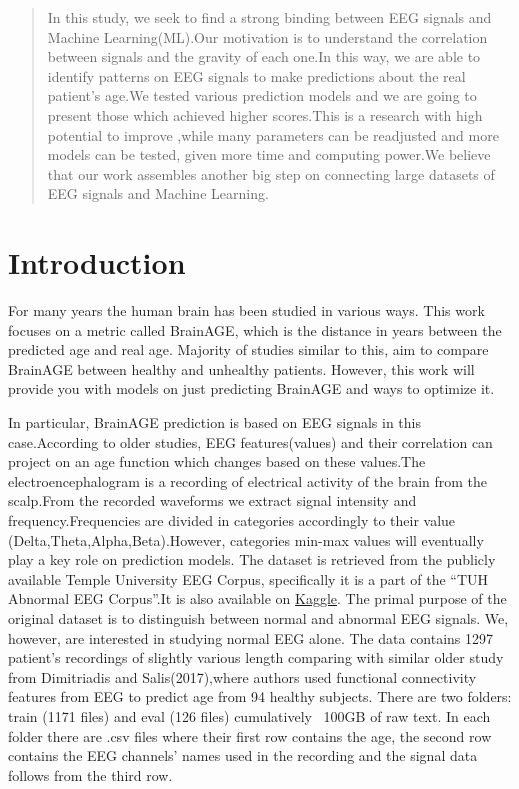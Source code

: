 \begin{abstract}
In this study, we seek to find a strong binding between EEG signals and Machine Learning(ML).Our motivation is to understand the correlation between signals and the gravity of each one.In this way, we are able to identify patterns on EEG signals to make predictions about the real patient’s age.We tested various prediction models and we are going to  present those which achieved higher scores.This is a research with high potential to improve ,while many parameters can be readjusted and more models can be tested, given more time and computing power.We believe that our work assembles another big step on connecting large datasets of EEG signals and Machine Learning.

\end{abstract}

\section{Introduction}
For many years the human brain has been studied in various ways. This work focuses on a metric called BrainAGE, which is the distance in years between the predicted age and real age. Majority of studies similar to this, aim to compare BrainAGE between healthy and unhealthy patients.
However, this work will provide you with models on just predicting BrainAGE and ways to optimize it.
\par
In particular,  BrainAGE prediction is based on EEG signals in this case.According to older studies, EEG features(values) and their correlation can project on an age function which changes based on these values.The electroencephalogram is a recording of electrical activity of the brain from the scalp.From the recorded waveforms we extract signal intensity and frequency.Frequencies are divided in categories accordingly to their value (Delta,Theta,Alpha,Beta).However, categories min-max values will eventually play a key role on prediction models.
The dataset is retrieved from the publicly available Temple University EEG Corpus, specifically it is a part of the “TUH Abnormal EEG Corpus”.It is also available on \href{https://www.kaggle.com/ayurgo/data-eeg-age-v1}{Kaggle}.  The primal purpose of the original dataset is to distinguish between normal and abnormal EEG signals. We, however, are interested in studying normal EEG alone. The data contains 1297 patient’s recordings of slightly various length comparing with similar older study from Dimitriadis and Salis(2017),where authors used functional connectivity features from EEG to predict age from 94 healthy subjects. 
There are two folders: train (1171 files) and eval (126 files) cumulatively ~100GB of raw text. In each folder there are .csv files where their first row contains the age, the second row contains the EEG channels’ names used in the recording  and the signal data follows from the third row.


